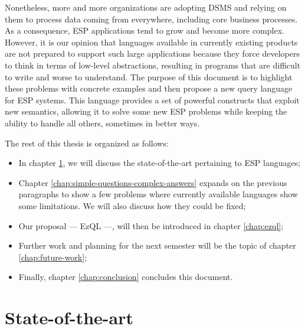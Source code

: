 \documentclass{report}
\begin{document}
Nonetheless, more and more organizations are adopting DSMS and relying
on them to process data coming from everywhere, including core
business processes. As a consequence, ESP applications tend to grow
and become more complex. However, it is our opinion that languages
available in currently existing products are not prepared to support
such large applications because they force developers to think in
terms of low-level abstractions, resulting in programs that are
difficult to write and worse to understand. The purpose of this
document is to highlight these problems with concrete examples and
then propose a new query language for ESP systems. This language
provides a set of powerful constructs that exploit new semantics,
allowing it to solve some new ESP problems while keeping the ability
to handle all others, sometimes in better ways.

The rest of this thesis is organized as follows:

\begin{itemize}
\item In chapter \ref{chap:soa}, we will discuss the state-of-the-art
  pertaining to ESP languages;
\item Chapter \ref{chap:simple-questions-complex-answers} expands on
  the previous paragraphs to show a few problems where currently
  available languages show some limitations. We will also discuss how
  they could be fixed;
\item Our proposal --- EzQL ---, will then be introduced in chapter
  \ref{chap:ezql};
\item Further work and planning for the next semester will be the
  topic of chapter \ref{chap:future-work};
\item Finally, chapter \ref{chap:conclusion} concludes this document.
\end{itemize}

\chapter{State-of-the-art}
\label{chap:soa}
\end{document}
